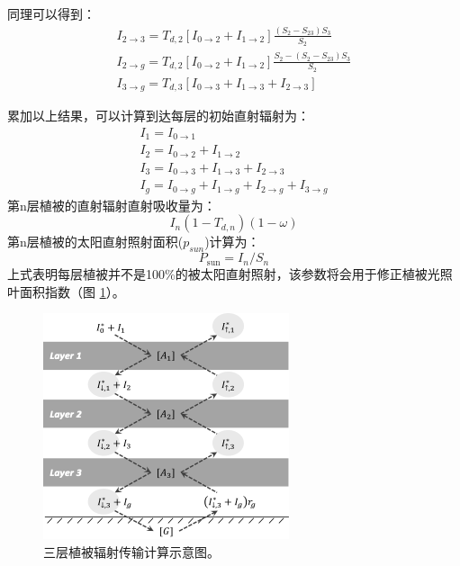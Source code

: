 同理可以得到：
\begin{equation}
\begin{array}{l}I_{2 \rightarrow 3}=T_{d, 2}\left[I_{0 \rightarrow 2}+I_{1 \rightarrow 2}\right] \frac{\left(S_{2}-S_{23}\right) S_{3}}{S_{2}} \\
     I_{2 \rightarrow g}=T_{d, 2}\left[I_{0 \rightarrow 2}+I_{1 \rightarrow 2}\right] \frac{S_{2}-\left(S_{2}-S_{23}\right) S_{3}}{S_{2}} \\ 
     I_{3 \rightarrow g}=T_{d, 3}\left[I_{0 \rightarrow 3}+I_{1 \rightarrow 3}+I_{2 \rightarrow 3}\right]\end{array}
\end{equation}

累加以上结果，可以计算到达每层的初始直射辐射为：
\begin{equation}
\begin{array}{l}I_{1}=I_{0 \rightarrow 1} \\ I_{2}=I_{0 \rightarrow 2}+I_{1 \rightarrow 2} \\ 
    I_{3}=I_{0 \rightarrow 3}+I_{1 \rightarrow 3}+I_{2 \rightarrow 3} \\ 
    I_{g}=I_{0 \rightarrow g}+I_{1 \rightarrow g}+I_{2 \rightarrow g}+I_{3 \rightarrow g}\end{array}
\end{equation}
第n层植被的直射辐射直射吸收量为：
\begin{equation}
I_{n}\left(1-T_{d, n}\right)(1-\omega)
\end{equation}
第n层植被的太阳直射照射面积($p_{sun}$)计算为：
\begin{equation}
P_{\mathrm{sun}}=I_{n} / S_{n}
\end{equation}
上式表明每层植被并不是100\%的被太阳直射照射，该参数将会用于修正植被光照叶面积指数（图 \ref{fig:三层植被辐射传输计算示意图}）。
{
\begin{figure}[]
\centering
\includegraphics{Figures/辐射过程及辐射通量计算/三层植被辐射传输计算示意图.png}
\caption{三层植被辐射传输计算示意图。}
\label{fig:三层植被辐射传输计算示意图}
\end{figure}
}
